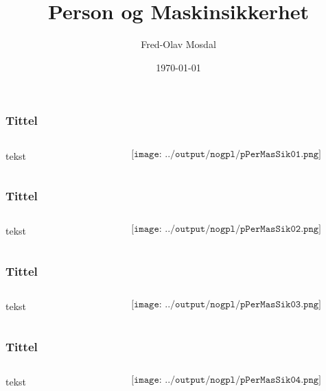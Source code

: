 \documentclass[aspectratio=169,xcolor=dvipsnames]{beamer}
\title[permas]{Person og Maskinsikkerhet} %
\author[Fred-Olav] {Fred-Olav Mosdal}
\institute[Gand VGS] %
{
    Gand VGS \\
    VG3 Automasjon }
\date{\today} %
\begin{document}
\begin{frame}
	\frametitle{Tittel}
	\begin{columns}
		\begin{column}{0.5\textwidth}
tekst
			
		\end{column}

		\begin{column}{0.5\textwidth}
	$$\texttt{[image: ../output/nogpl/pPerMasSik01.png]}$$
		\end{column}
	\end{columns}
\end{frame}

\begin{frame}
	\frametitle{Tittel}
	\begin{columns}
		\begin{column}{0.5\textwidth}
tekst
			
		\end{column}

		\begin{column}{0.5\textwidth}
	$$\texttt{[image: ../output/nogpl/pPerMasSik02.png]}$$
		\end{column}
	\end{columns}
\end{frame}

\begin{frame}
	\frametitle{Tittel}
	\begin{columns}
		\begin{column}{0.5\textwidth}
tekst
			
		\end{column}

		\begin{column}{0.5\textwidth}
	$$\texttt{[image: ../output/nogpl/pPerMasSik03.png]}$$
		\end{column}
	\end{columns}
\end{frame}

\begin{frame}
	\frametitle{Tittel}
	\begin{columns}
		\begin{column}{0.5\textwidth}
tekst
			
		\end{column}

		\begin{column}{0.5\textwidth}
	$$\texttt{[image: ../output/nogpl/pPerMasSik04.png]}$$
		\end{column}
	\end{columns}
\end{frame}
\end{document}
